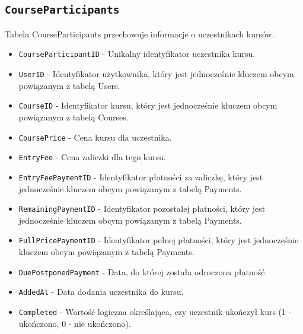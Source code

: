 \documentclass[11pt]{article}
\begin{document}
\subsection{\texttt{CourseParticipants}}
\label{sec:orga4da90c}
Tabela CourseParticipants przechowuje informacje o uczestnikach kursów.
\begin{itemize}
\item \texttt{CourseParticipantID} - Unikalny identyfikator uczestnika kursu.
\item \texttt{UserID} - Identyfikator użytkownika, który jest jednocześnie kluczem obcym powiązanym z tabelą Users.
\item \texttt{CourseID} - Identyfikator kursu, który jest jednocześnie kluczem obcym powiązanym z tabelą Courses.
\item \texttt{CoursePrice} - Cena kursu dla uczestnika.
\item \texttt{EntryFee} - Cena zaliczki dla tego kursu.
\item \texttt{EntryFeePaymentID} - Identyfikator płatności za zaliczkę, który jest jednocześnie kluczem obcym powiązanym z tabelą Payments.
\item \texttt{RemainingPaymentID} - Identyfikator pozostałej płatności, który jest jednocześnie kluczem obcym powiązanym z tabelą Payments.
\item \texttt{FullPricePaymentID} - Identyfikator pełnej płatności, który jest jednocześnie kluczem obcym powiązanym z tabelą Payments.
\item \texttt{DuePostponedPayment} - Data, do której została odroczona płatność.
\item \texttt{AddedAt} - Data dodania uczestnika do kursu.
\item \texttt{Completed} - Wartość logiczna określająca, czy uczestnik ukończył kurs (1 - ukończono, 0 - nie ukończono).
\end{itemize}
\end{document}
